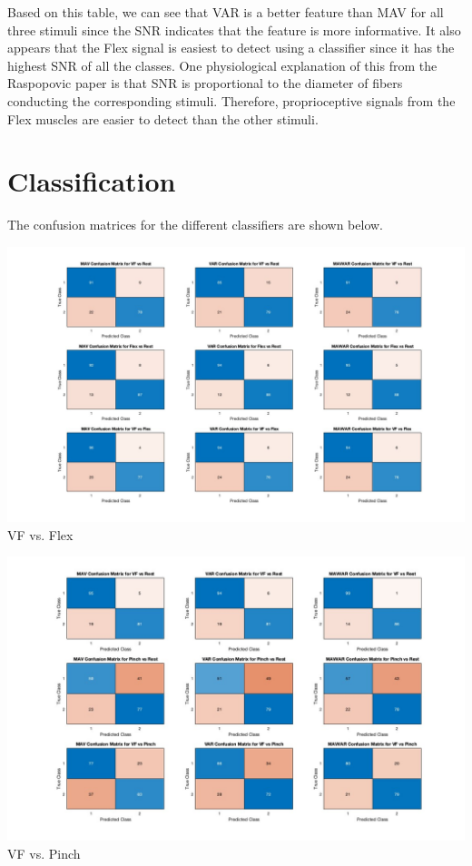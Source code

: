 \documentclass[12pt]{article}
\begin{document}
Based on this table, we can see that VAR is a better feature than MAV for all three stimuli since the SNR indicates that the feature is more informative. It also appears that the Flex signal is easiest to detect using a classifier since it has the highest SNR of all the classes. One physiological explanation of this from the Raspopovic paper is that SNR is proportional to the diameter of fibers conducting the corresponding stimuli. Therefore, proprioceptive signals from the Flex muscles are easier to detect than the other stimuli.

\section{Classification}
The confusion matrices for the different classifiers are shown below.

\begin{center}
    \includegraphics[width=\textwidth]{vf_flex.jpg}
    VF vs. Flex
\end{center}

\begin{center}
    \includegraphics[width=\textwidth]{vf_pinch.jpg}
    VF vs. Pinch
\end{center}
\end{document}
